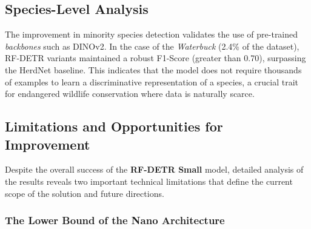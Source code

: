 \subsection{Species-Level Analysis}

The improvement in minority species detection validates the use of pre-trained \textit{backbones} such as DINOv2. In the case of the \textit{Waterbuck} (2.4\% of the dataset), RF-DETR variants maintained a robust F1-Score (greater than 0.70), surpassing the HerdNet baseline. This indicates that the model does not require thousands of examples to learn a discriminative representation of a species, a crucial trait for endangered wildlife conservation where data is naturally scarce.

\subsection{Limitations and Opportunities for Improvement}

Despite the overall success of the \textbf{RF-DETR Small} model, detailed analysis of the results reveals two important technical limitations that define the current scope of the solution and future directions.

\subsubsection{The Lower Bound of the Nano Architecture}

